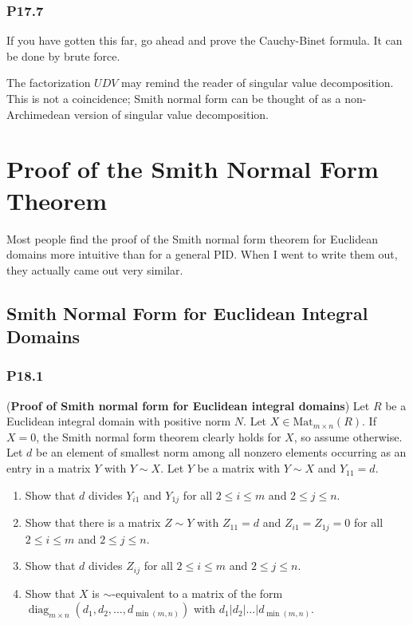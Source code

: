 \documentclass[lang=cn,11pt]{template}
\begin{document}
\subsection*{P17.7}
If you have gotten this far, go ahead and prove the Cauchy-Binet formula. It can be done by brute force.

\begin{remark}
The factorization \( U D V \) may remind the reader of singular value decomposition. This is not a coincidence; Smith normal form can be thought of as a non-Archimedean version of singular value decomposition.
\end{remark}











\chapter{Proof of the Smith Normal Form Theorem}

Most people find the proof of the Smith normal form theorem for Euclidean domains more intuitive than for a general PID. When I went to write them out, they actually came out very similar.

\section{Smith Normal Form for Euclidean Integral Domains}

\subsection*{P18.1} (\textbf{Proof of Smith normal form for Euclidean integral domains}) Let \( R \) be a Euclidean integral domain with positive norm \( N \). Let \( X \in \text{Mat}_{m \times n}(R) \). If \( X = 0 \), the Smith normal form theorem clearly holds for \( X \), so assume otherwise. Let \( d \) be an element of smallest norm among all nonzero elements occurring as an entry in a matrix \( Y \) with \( Y \sim X \). Let \( Y \) be a matrix with \( Y \sim X \) and \( Y_{11} = d \).
\begin{enumerate}
    \item Show that \( d \) divides \( Y_{i1} \) and \( Y_{1j} \) for all \( 2 \leq i \leq m \) and \( 2 \leq j \leq n \).
    \item Show that there is a matrix \( Z \sim Y \) with \( Z_{11} = d \) and \( Z_{i1} = Z_{1j} = 0 \) for all \( 2 \leq i \leq m \) and \( 2 \leq j \leq n \).
    \item Show that \( d \) divides \( Z_{ij} \) for all \( 2 \leq i \leq m \) and \( 2 \leq j \leq n \).
    \item Show that \( X \) is \( \sim \)-equivalent to a matrix of the form \( \operatorname{diag}_{m \times n}(d_1, d_2, \dots, d_{\min(m,n)}) \) with \( d_1 | d_2 | \dots | d_{\min(m,n)} \).
\end{enumerate}
\end{document}
